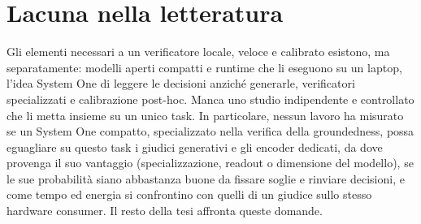 \section{Lacuna nella letteratura}
\label{sec:bg-gap}

Gli elementi necessari a un verificatore locale, veloce e calibrato esistono, ma separatamente: modelli aperti compatti e
runtime che li eseguono su un laptop, l'idea System One di leggere le decisioni anziché generarle, verificatori
specializzati e calibrazione post-hoc. Manca uno studio indipendente e controllato che li metta insieme su un unico
task. In particolare, nessun lavoro ha misurato se un System One compatto, specializzato nella verifica della
groundedness, possa eguagliare su questo task i giudici generativi e gli encoder dedicati, da dove provenga il suo
vantaggio (specializzazione, readout o dimensione del modello), se le sue probabilità siano abbastanza buone da fissare
soglie e rinviare decisioni, e come tempo ed energia si confrontino con quelli di un giudice sullo stesso hardware
consumer. Il resto della tesi affronta queste domande.
